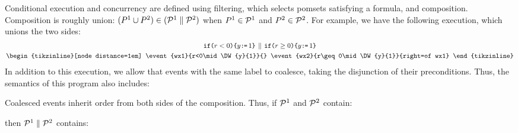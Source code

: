 Conditional execution and concurrency are defined using filtering, which
selects pomsets satisfying a formula, and composition.  Composition is
roughly union: $(P^1\cup P^2) \in (\mathcal{P}^1 \parallel \mathcal{P}^2)$ when
$P^1 \in \mathcal{P}^1$ and $P^2 \in \mathcal{P}^2$.  For example, we have the
following execution, which unions the two sides:
\begin{gather*}
  \IF{r<0}\THEN y\GETS1\FI
  \PAR
  \IF{r\geq0}\THEN y\GETS1\FI
  \\
  \hbox{\begin{tikzinline}[node distance=1em]
  \event{wx1}{r<0\mid\DW{y}{1}}{}
  \event{wx2}{r\geq0\mid\DW{y}{1}}{right=of wx1}
    \end{tikzinline}}
\end{gather*}
In addition to this execution, we allow that events with the same label to
coalesce, taking the disjunction of their preconditions.  Thus, the semantics
of this program also includes:
\begin{tikzdisplay}[node distance=1em]
\end{tikzdisplay}
Coalesced events inherit order from both sides of the composition.
Thus, if
$\mathcal{P}^1$ and $\mathcal{P}^2$ contain:
\begin{tikzdisplay}[node distance=1em]
\end{tikzdisplay}
then $\mathcal{P}^1 \parallel \mathcal{P}^2$ contains:
\begin{tikzdisplay}[node distance=1em]
\end{tikzdisplay}

